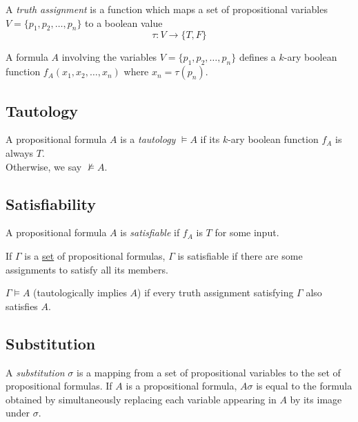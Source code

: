 \documentclass[a4paper]{article}
\begin{document}
A \textit{truth assignment} is a function which maps a set of propositional
variables \(V=\{p_1, p_2, \ldots, p_n\}\) to a boolean value
\[
    \tau: V \to \{T,F\}
\]

A formula \(A\) involving the variables \(V=\{p_1, p_2, \ldots, p_n\}\)
defines a \(k\)-ary boolean function \(f_A(x_1, x_2, \ldots, x_n)\) where \(x_n = \tau(p_n)\).



%
%
%
\subsection{Tautology}

A propositional formula \(A\) is a \textit{tautology} \(\vDash A\) if its \(k\)-ary boolean
function \(f_A\) is always \(T\). \\
Otherwise, we say \(\nvDash A\).

\subsection{Satisfiability}

A propositional formula \(A\) is \textit{satisfiable}
if \(f_A\) is \(T\) for some input.

If \(\Gamma\) is a \underline{set} of propositional formulas, \(\Gamma\)
is satisfiable if there are some assignments to satisfy all its members.

\(\Gamma \vDash A\) (tautologically implies \(A\))
if every truth assignment satisfying \(\Gamma\)
also satisfies \(A\).

\subsection{Substitution}

A \textit{substitution} \(\sigma\)
is a mapping from a set of propositional variables
to the set of propositional formulas.
If \(A\) is a propositional formula, \(A\sigma\)
is equal to the formula obtained by simultaneously
replacing each variable appearing in \(A\)
by its image under \(\sigma\).
\end{document}
